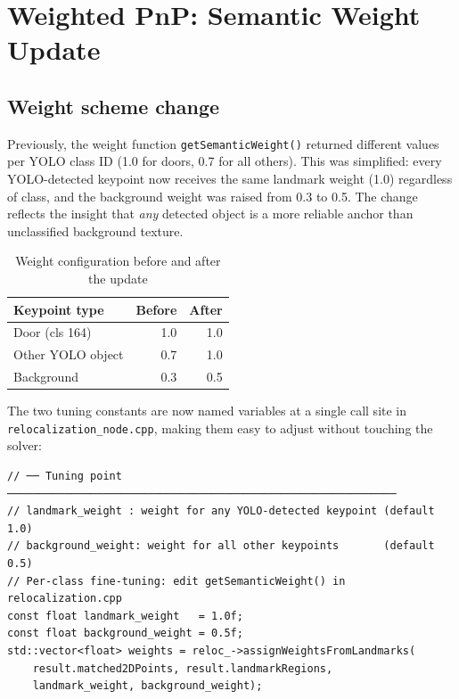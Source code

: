 \documentclass[11pt,a4paper]{article}
\begin{document}
\section{Weighted PnP: Semantic Weight Update}

\subsection{Weight scheme change}

Previously, the weight function \texttt{getSemanticWeight()} returned different
values per YOLO class ID (1.0 for doors, 0.7 for all others). This was
simplified: every YOLO-detected keypoint now receives the same landmark weight
(1.0) regardless of class, and the background weight was raised from 0.3 to
0.5. The change reflects the insight that \emph{any} detected object is a
more reliable anchor than unclassified background texture.

\begin{table}[H]
\centering
\caption{Weight configuration before and after the update}
\begin{tabularx}{0.7\textwidth}{@{}X r r@{}}
\toprule
\textbf{Keypoint type} & \textbf{Before} & \textbf{After} \\
\midrule
Door (cls 164)        & 1.0  & 1.0 \\
Other YOLO object     & 0.7  & 1.0 \\
Background            & 0.3  & 0.5 \\
\bottomrule
\end{tabularx}
\end{table}

The two tuning constants are now named variables at a single call site in
\texttt{relocalization\_node.cpp}, making them easy to adjust without touching
the solver:

\begin{lstlisting}[style=cpp, caption={Tuning point in \texttt{relocalization\_node.cpp}}]
// ── Tuning point ─────────────────────────────────────────────────────────────
// landmark_weight : weight for any YOLO-detected keypoint (default 1.0)
// background_weight: weight for all other keypoints       (default 0.5)
// Per-class fine-tuning: edit getSemanticWeight() in relocalization.cpp
const float landmark_weight   = 1.0f;
const float background_weight = 0.5f;
std::vector<float> weights = reloc_->assignWeightsFromLandmarks(
    result.matched2DPoints, result.landmarkRegions,
    landmark_weight, background_weight);
\end{lstlisting}
\end{document}

